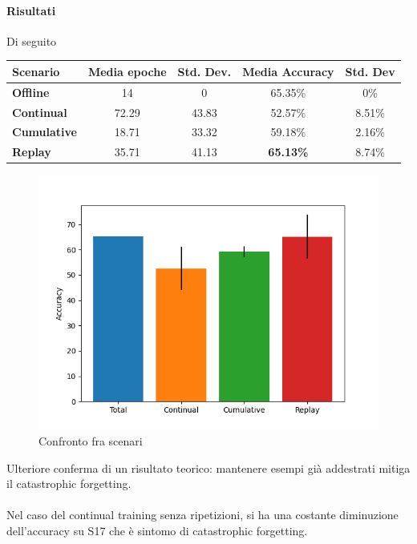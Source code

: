 \documentclass[11pt, a4paper, twoside, openright]{book}
\begin{document}
\paragraph{Risultati} Di seguito\\
\begin{tabular}{l|c|c|c|c}
    \textbf{Scenario} & \textbf{Media epoche} & \textbf{Std. Dev.} & \textbf{Media Accuracy} & \textbf{Std. Dev} \\
    \hline 
    \textbf{Offline} & 14 & 0 & 65.35\% & 0\% \\
    \textbf{Continual} & 72.29 & 43.83 & 52.57\% & 8.51\%\\
    \textbf{Cumulative} & 18.71 & 33.32 & 59.18\% & 2.16\%\\
    \textbf{Replay} & 35.71 & 41.13 & \textbf{65.13\%} & 8.74\%\\
\end{tabular}
\begin{figure}
    \centering
    \includegraphics[scale=0.75]{img/sixth.png}
    \caption{Confronto fra scenari}
    \label{fig:sixth}
\end{figure}
Ulteriore conferma di un risultato teorico: mantenere esempi già addestrati mitiga il catastrophic forgetting.\\\\
Nel caso del continual training senza ripetizioni, si ha una costante diminuzione dell'accuracy su S17 che è sintomo di catastrophic forgetting.\\
\end{document}
